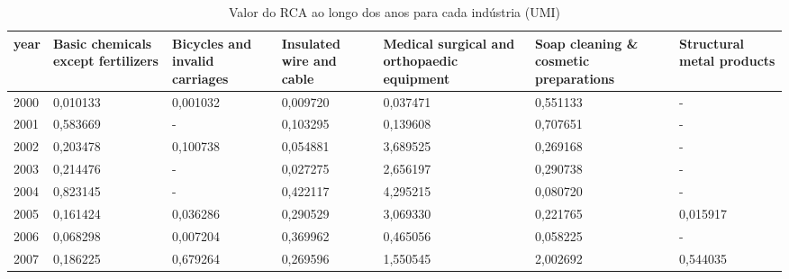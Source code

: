 \begin{table}
\centering
\caption{Valor do RCA ao longo dos anos para cada indústria (UMI)}
\begin{tabular}{p{1cm}p{2cm}p{2cm}p{2cm}p{2cm}p{2cm}p{2cm}}
\toprule
 year &  Basic chemicals except fertilizers &  Bicycles and invalid carriages &  Insulated wire and cable &  Medical surgical and orthopaedic equipment &  Soap cleaning \& cosmetic preparations &  Structural metal products \\
\midrule
 2000 &                            0,010133 &                        0,001032 &                  0,009720 &                                    0,037471 &                               0,551133 &                          - \\
 2001 &                            0,583669 &                               - &                  0,103295 &                                    0,139608 &                               0,707651 &                          - \\
 2002 &                            0,203478 &                        0,100738 &                  0,054881 &                                    3,689525 &                               0,269168 &                          - \\
 2003 &                            0,214476 &                               - &                  0,027275 &                                    2,656197 &                               0,290738 &                          - \\
 2004 &                            0,823145 &                               - &                  0,422117 &                                    4,295215 &                               0,080720 &                          - \\
 2005 &                            0,161424 &                        0,036286 &                  0,290529 &                                    3,069330 &                               0,221765 &                   0,015917 \\
 2006 &                            0,068298 &                        0,007204 &                  0,369962 &                                    0,465056 &                               0,058225 &                          - \\
 2007 &                            0,186225 &                        0,679264 &                  0,269596 &                                    1,550545 &                               2,002692 &                   0,544035 \\

\end{tabular}
\end{table}
